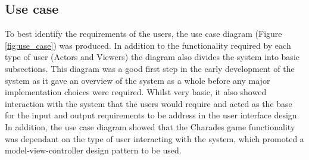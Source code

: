 \subsection{Use case}
\begin{figure}[h!]
\end{figure}
To best identify the requirements of the users, the use case diagram (Figure \ref{fig:use_case}) was produced. In addition to the functionality required by each type of user (Actors and Viewers) the diagram also divides the system into basic subsections. This diagram was a good first step in the early development of the system as it gave an overview of the system as a whole before any major implementation choices were required. Whilst very basic, it also showed interaction with the system that the users would require and acted as the base for the input and output requirements to be address in the user interface design. In addition, the use case diagram showed that the Charades game functionality was dependant on the type of user interacting with the system, which promoted a model-view-controller design pattern to be used.

